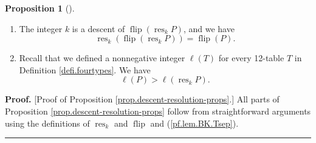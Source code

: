 \documentclass[numbers=enddot,12pt,final,onecolumn,notitlepage]{scrartcl}%
\theoremstyle{definition}
\newtheorem{prop}[theo]{Proposition}
\newenvironment{proposition}[1][]
{\begin{prop}[#1]\begin{leftbar}}
{\end{leftbar}\end{prop}}
\newenvironment{proof}[1][Proof]{\noindent\textbf{#1.} }{\ \rule{0.5em}{0.5em}}
\def\lm{{\lambda/\mu}}
\begin{document}
\begin{proposition}
\begin{enumerate}

\item \label{pf.lem.BK.res.flip}
The integer $k$ is a descent of $\operatorname*{flip}\left(  \operatorname*{res}%
\nolimits_{k}P\right)$, and we have
\[
\operatorname*{res}%
\nolimits_{k}\left(  \operatorname*{flip}\left(  \operatorname*{res}%
\nolimits_{k}P\right)  \right) = \operatorname*{flip}\left(  P\right).
\]

\item \label{pf.lem.BK.res.lendec}
Recall that we defined a nonnegative integer $\ell\left(
T\right)  $ for every 12-table $T$ in Definition \ref{defi.fourtypes}. We
have
\[
\ell\left(  P\right)  >\ell\left(  \operatorname*{res}\nolimits_{k}P\right)  .
\]

\end{enumerate}

\end{proposition}

\begin{proof}
[Proof of Proposition \ref{prop.descent-resolution-props}.]
All parts of Proposition \ref{prop.descent-resolution-props} follow from straightforward arguments
using the definitions of $\operatorname*{res}_{k}$ and $\operatorname*{flip}$
and (\ref{pf.lem.BK.Tsep}).
\end{proof}


\end{document}
